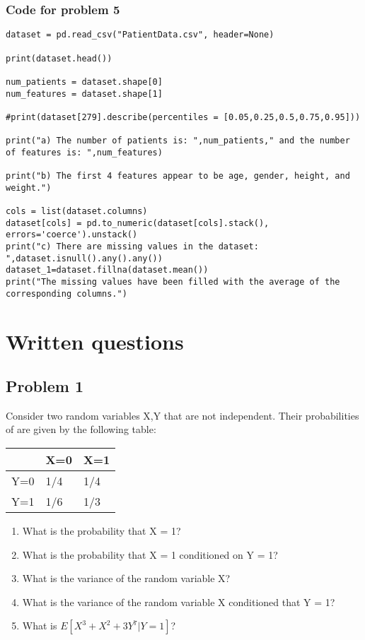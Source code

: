 \documentclass[12pt]{article}%
\begin{document}
\subsubsection{Code for problem 5}
\begin{lstlisting}
dataset = pd.read_csv("PatientData.csv", header=None)

print(dataset.head())

num_patients = dataset.shape[0]
num_features = dataset.shape[1]

#print(dataset[279].describe(percentiles = [0.05,0.25,0.5,0.75,0.95]))

print("a) The number of patients is: ",num_patients," and the number of features is: ",num_features)

print("b) The first 4 features appear to be age, gender, height, and weight.")

cols = list(dataset.columns) 
dataset[cols] = pd.to_numeric(dataset[cols].stack(), errors='coerce').unstack()
print("c) There are missing values in the dataset: ",dataset.isnull().any().any())
dataset_1=dataset.fillna(dataset.mean())
print("The missing values have been filled with the average of the corresponding columns.")
\end{lstlisting}


\section{Written questions}

\subsection{Problem 1}

Consider two random variables X,Y that are not independent. Their probabilities of are given by the following table:

\begin{table}[!h]
\centering
\begin{tabular}{|l|l|l|}
\hline
    & X=0 & X=1 \\ \hline
Y=0 & 1/4 & 1/4 \\ \hline
Y=1 & 1/6 & 1/3 \\ \hline
\end{tabular}
\end{table}

\begin{enumerate}
    \item What is the probability that X = 1?
    \item What is the probability that X = 1 conditioned on Y = 1?
    \item What is the variance of the random variable X?
    \item What is the variance of the random variable X conditioned that Y = 1?
    \item What is $E[X^3 + X^2 + 3Y^7|Y = 1]$? 
\end{enumerate}
\end{document}
